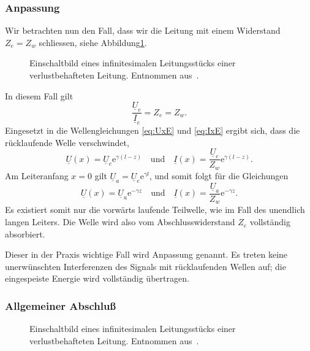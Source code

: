 \documentclass[paper=a4, parskip=half-, ngerman, fontsize=11pt]{scrreprt}
\begin{document}
\subsubsection{Anpassung}
Wir betrachten nun den Fall, dass wir die Leitung mit einem Widerstand $Z_{e} = Z_{w}$ schliessen, siehe
Abbildung\ref{AbschlussMitWiderstand}.
\begin{figure}[!htpb]
    \begin{center}
        
        \caption{Einschaltbild eines infinitesimalen Leitungsstücks einer verlustbehafteten Leitung. Entnommen
            aus~\cite{LeitungenUndFilter}.}
        \label{AbschlussMitWiderstand}
    \end{center}
\end{figure}
In diesem Fall gilt
\[ \frac{\underline{U}_{e}}{\underline{I}_{e}} = Z_{e} = Z_{w}. \]
Eingesetzt in die Wellengleichungen \eqref{eq:UxE} und \eqref{eq:IxE} ergibt sich, dass die rücklaufende Welle
verschwindet,
\[ \underline{U}(x) = \underline{U}_{e} \mathrm{e}^{\gamma (l - z)} \quad \text{und} \quad
\underline{I}(x) = \frac{\underline{U}_{e}}{Z_{w}} \mathrm{e}^{\gamma (l - z)}. \]
Am Leiteranfang $x = 0$ gilt $\underline{U}_{a} = \underline{U}_{e} \mathrm{e}^{\gamma l}$, und somit
folgt für die Gleichungen
\[ \underline{U}(x) = \underline{U}_{a} \mathrm{e}^{- \gamma z} \quad \text{und} \quad
\underline{I}(x) = \frac{\underline{U}_{a}}{Z_{w}} \mathrm{e}^{- \gamma z}. \]
Es existiert somit nur die vorwärts laufende Teilwelle, wie im Fall des unendlich langen Leiters. Die Welle wird also
vom Abschlusswiderstand $Z_{e}$ vollständig absorbiert.

Dieser in der Praxis wichtige Fall wird Anpassung genannt. Es treten keine unerwünschten Interferenzen des Signals mit
rücklaufenden Wellen auf; die eingespeiste Energie wird vollständig übertragen.

\subsubsection{Allgemeiner Abschluß}


\begin{figure}[!htpb]
    \begin{center}
        
        \caption{Einschaltbild eines infinitesimalen Leitungsstücks einer verlustbehafteten Leitung. Entnommen
            aus~\cite{LeitungenUndFilter}.}
        \label{ImaginaerWelle}
    \end{center}
\end{figure}





\printbibliography
\end{document}
